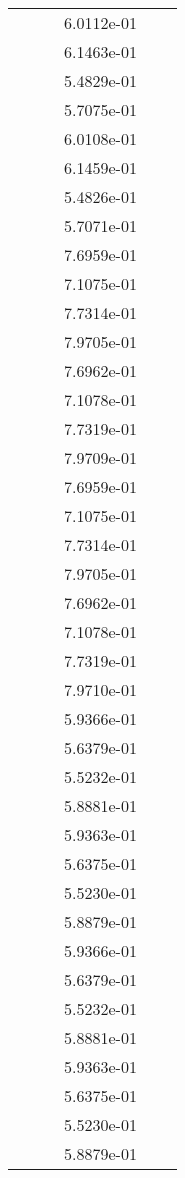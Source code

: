 \begin{xltabular}{\textwidth}{r|rS[table-format=1.3e+2]S[table-format=1.4e+2]S[table-format=1.4e+2]S[table-format=-1.5]}
&  &  & 6.0112e-01 & & \\
&  &  & 6.1463e-01 & & \\
&  &  & 5.4829e-01 & & \\
&  &  & 5.7075e-01 & & \\
&  &  & 6.0108e-01 & & \\
&  &  & 6.1459e-01 & & \\
&  &  & 5.4826e-01 & & \\
&  &  & 5.7071e-01 & & \\
&  &  & 7.6959e-01 & & \\
&  &  & 7.1075e-01 & & \\
&  &  & 7.7314e-01 & & \\
&  &  & 7.9705e-01 & & \\
&  &  & 7.6962e-01 & & \\
&  &  & 7.1078e-01 & & \\
&  &  & 7.7319e-01 & & \\
&  &  & 7.9709e-01 & & \\
&  &  & 7.6959e-01 & & \\
&  &  & 7.1075e-01 & & \\
&  &  & 7.7314e-01 & & \\
&  &  & 7.9705e-01 & & \\
&  &  & 7.6962e-01 & & \\
&  &  & 7.1078e-01 & & \\
&  &  & 7.7319e-01 & & \\
&  &  & 7.9710e-01 & & \\
&  &  & 5.9366e-01 & & \\
&  &  & 5.6379e-01 & & \\
&  &  & 5.5232e-01 & & \\
&  &  & 5.8881e-01 & & \\
&  &  & 5.9363e-01 & & \\
&  &  & 5.6375e-01 & & \\
&  &  & 5.5230e-01 & & \\
&  &  & 5.8879e-01 & & \\
&  &  & 5.9366e-01 & & \\
&  &  & 5.6379e-01 & & \\
&  &  & 5.5232e-01 & & \\
&  &  & 5.8881e-01 & & \\
&  &  & 5.9363e-01 & & \\
&  &  & 5.6375e-01 & & \\
&  &  & 5.5230e-01 & & \\
&  &  & 5.8879e-01 & & \\

\end{xltabular}
